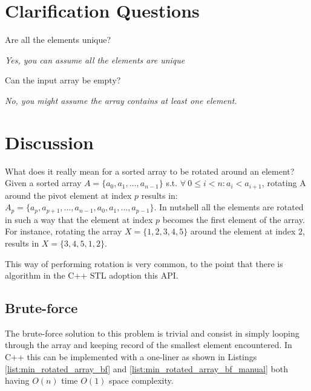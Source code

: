 \section{Clarification Questions}

\begin{QandA}
	\item Are all the elements unique? 
	\begin{answered}
		\textit{Yes, you can assume all the elements are unique}
	\end{answered}
	\item Can the input array be empty?
	\begin{answered}
		\textit{No, you might assume the array contains at least one element.}
	\end{answered}
\end{QandA}

\section{Discussion}
\label{min_rotated_array:sec:discussion}
What does it really mean for a sorted array to be rotated around an element? Given a sorted array $A=\{a_0, a_1, \ldots,a_{n-1}\}$ s.t. $ \forall \: 0 \leq i < n: a_i < a_{i+1}$, rotating A around the pivot element at index $p$ results in: $A_p=\{a_p, a_{p+1}, \ldots,a_{n-1}, a_0, a_1, \ldots, a_{p-1}\}$. In  nutshell all the elements are rotated in such a way that the element at index $p$ becomes the first element of the array. For instance, rotating the array $X=\{1,2,3,4,5\}$ around the element at index $2$, results in $X=\{3,4,5,1,2\}$. 

This way of performing rotation is very common, to the point that there is algorithm in the C++ STL\cite{cit::std::rotate} adoption this API.


\subsection{Brute-force}
\label{min_rotated_array:sec:bruteforce}
The brute-force solution to this problem is trivial and consist in simply looping through the array and keeping record of the smallest element encountered. In C++ this can be implemented with a one-liner as shown in Listings \ref{list:min_rotated_array_bf} and \ref{list:min_rotated_array_bf_manual} both having $O(n)$ time $O(1)$ space complexity.




